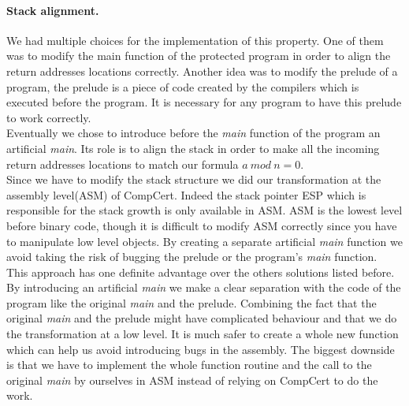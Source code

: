 \documentclass[11pt]{sdm}
\begin{document}
\paragraph{Stack alignment.}
\label{par:Stack alignment}

We had multiple choices for the implementation of this property. One of them was to modify the main function of the protected program in order to align the return addresses locations correctly. Another idea was to modify the prelude of a program, the prelude is a piece of code created by the compilers which is executed before the program. It is necessary for any program to have this prelude to work correctly. \\
Eventually we chose to introduce before the \textit{main} function of the program an artificial \textit{main}. Its role is to align the stack in order to make all the incoming return addresses locations to match our formula $a~mod~n=0$. \\
Since we have to modify the stack structure we did our transformation at the assembly level(ASM) of CompCert. Indeed the stack pointer ESP which is responsible for the stack growth is only available in ASM. ASM is the lowest level before binary code, though it is difficult to modify ASM correctly since you have to manipulate low level objects. 
By creating a separate artificial \textit{main} function we avoid taking the risk of bugging the prelude or the program's \textit{main} function.\\
This approach has one definite advantage over the others solutions listed before. 
By introducing an artificial \textit{main} we make a clear separation with the code of the program like the original \textit{main} and the prelude. Combining the fact that the original \textit{main} and the prelude might have complicated behaviour and that we do the transformation at a low level.
It is much safer to create a whole new function which can help us avoid introducing bugs in the assembly. The biggest downside is that we have to implement the whole function routine and the call to the original \textit{main} by ourselves in ASM instead of relying on CompCert to do the work.
\end{document}
